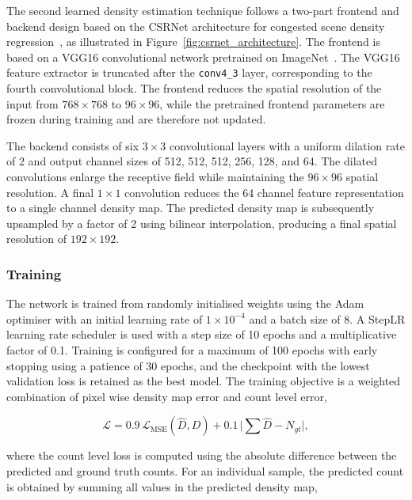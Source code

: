 The second learned density estimation technique follows a two-part frontend and backend design based on the CSRNet architecture for congested scene density regression~\cite{li2018csrnet}, as illustrated in Figure~\ref{fig:csrnet_architecture}. The frontend is based on a VGG16 convolutional network pretrained on ImageNet~\cite{simonyan2015vgg}. The VGG16 feature extractor is truncated after the \texttt{conv4\_3} layer, corresponding to the fourth convolutional block. The frontend reduces the spatial resolution of the input from $768 \times 768$ to $96 \times 96$, while the pretrained frontend parameters are frozen during training and are therefore not updated.

The backend consists of six $3{\times}3$ convolutional layers with a uniform dilation rate of 2 and output channel sizes of 512, 512, 512, 256, 128, and 64. The dilated convolutions enlarge the receptive field while maintaining the $96{\times}96$ spatial resolution. A final $1{\times}1$ convolution reduces the 64 channel feature representation to a single channel density map. The predicted density map is subsequently upsampled by a factor of 2 using bilinear interpolation, producing a final spatial resolution of $192{\times}192$.

\subsubsection{Training}

The network is trained from randomly initialised weights using the Adam optimiser with an initial learning rate of $1\times10^{-4}$ and a batch size of 8. A StepLR learning rate scheduler is used with a step size of 10 epochs and a multiplicative factor of 0.1. Training is configured for a maximum of 100 epochs with early stopping using a patience of 30 epochs, and the checkpoint with the lowest validation loss is retained as the best model. The training objective is a weighted combination of pixel wise density map error and count level error,

\begin{equation}
	\mathcal{L} = 0.9 \, \mathcal{L}_{\text{MSE}}(\hat D, D) + 0.1 \, \bigl|{\textstyle\sum}\hat D - N_{gt}\bigr|,
\end{equation}

where the count level loss is computed using the absolute difference between the predicted and ground truth counts. For an individual sample, the predicted count is obtained by summing all values in the predicted density map,

